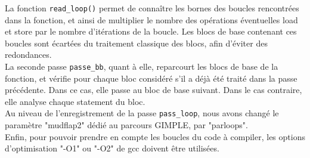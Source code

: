 La fonction \verb#read_loop()# permet de connaître les bornes des boucles rencontrées dans la fonction, et ainsi de multiplier le nombre des opérations éventuelles load et store par le nombre d'itérations de la boucle. Les blocs de base contenant ces boucles sont écartées du traitement classique des blocs, afin d'éviter des redondances.\\

La seconde passe \verb#passe_bb#, quant à elle, reparcourt les blocs de base de la fonction, et vérifie pour chaque bloc considéré s'il a déjà été traité dans la passe précédente. Dans ce cas, elle passe au bloc de base suivant. Dans le cas contraire, elle analyse chaque statement du bloc.\\ 

Au niveau de l'enregistrement de la passe \verb#pass_loop#, nous avons changé le paramètre "mudflap2" dédié au parcours GIMPLE, par "parloops".\\
Enfin, pour pouvoir prendre en compte les boucles du code à compiler, les options d'optimisation "-O1" ou "-O2" de gcc doivent être utilisées.
